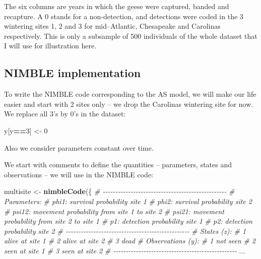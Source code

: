 \documentclass[
  12pt,
]{krantz}
\newenvironment{Shaded}{\begin{snugshade}}{\end{snugshade}}
\newcommand{\CommentTok}[1]{\textcolor[rgb]{0.56,0.35,0.01}{\textit{#1}}}
\newcommand{\DecValTok}[1]{\textcolor[rgb]{0.00,0.00,0.81}{#1}}
\newcommand{\FunctionTok}[1]{\textcolor[rgb]{0.13,0.29,0.53}{\textbf{#1}}}
\newcommand{\NormalTok}[1]{#1}
\newcommand{\OtherTok}[1]{\textcolor[rgb]{0.56,0.35,0.01}{#1}}
\newcommand{\SpecialCharTok}[1]{\textcolor[rgb]{0.81,0.36,0.00}{\textbf{#1}}}
\begin{document}
The six columns are years in which the geese were captured, banded and recapture. A 0 stands for a non-detection, and detections were coded in the 3 wintering sites 1, 2 and 3 for mid--Atlantic, Chesapeake and Carolinas respectively. This is only a subsample of 500 individuals of the whole dataset that I will use for illustration here.

\subsection{NIMBLE implementation}\label{nimble-implementation-1}

To write the NIMBLE code corresponding to the AS model, we will make our life easier and start with 2 sites only -- we drop the Carolinas wintering site for now. We replace all 3's by 0's in the dataset:

\begin{Shaded}
\begin{Highlighting}[]
\NormalTok{y[y}\SpecialCharTok{==}\DecValTok{3}\NormalTok{] }\OtherTok{\textless{}{-}} \DecValTok{0}
\end{Highlighting}
\end{Shaded}

Also we consider parameters constant over time.

We start with comments to define the quantities -- parameters, states and observations -- we will use in the NIMBLE code:

\begin{Shaded}
\begin{Highlighting}[]
\NormalTok{multisite }\OtherTok{\textless{}{-}} \FunctionTok{nimbleCode}\NormalTok{(\{}
  \CommentTok{\# {-}{-}{-}{-}{-}{-}{-}{-}{-}{-}{-}{-}{-}{-}{-}{-}{-}{-}{-}{-}{-}{-}{-}{-}{-}{-}{-}{-}{-}{-}{-}{-}{-}{-}{-}{-}{-}{-}{-}{-}{-}{-}{-}{-}{-}{-}{-}{-}{-}}
  \CommentTok{\# Parameters:}
  \CommentTok{\# phi1: survival probability site 1}
  \CommentTok{\# phi2: survival probability site 2}
  \CommentTok{\# psi12: movement probability from site 1 to site 2}
  \CommentTok{\# psi21: movement probability from site 2 to site 1}
  \CommentTok{\# p1: detection probability site 1}
  \CommentTok{\# p2: detection probability site 2}
  \CommentTok{\# {-}{-}{-}{-}{-}{-}{-}{-}{-}{-}{-}{-}{-}{-}{-}{-}{-}{-}{-}{-}{-}{-}{-}{-}{-}{-}{-}{-}{-}{-}{-}{-}{-}{-}{-}{-}{-}{-}{-}{-}{-}{-}{-}{-}{-}{-}{-}{-}{-}}
  \CommentTok{\# States (z):}
  \CommentTok{\# 1 alive at site 1}
  \CommentTok{\# 2 alive at site 2}
  \CommentTok{\# 3 dead}
  \CommentTok{\# Observations (y):}
  \CommentTok{\# 1 not seen}
  \CommentTok{\# 2 seen at site 1}
  \CommentTok{\# 3 seen at site 2}
  \CommentTok{\# {-}{-}{-}{-}{-}{-}{-}{-}{-}{-}{-}{-}{-}{-}{-}{-}{-}{-}{-}{-}{-}{-}{-}{-}{-}{-}{-}{-}{-}{-}{-}{-}{-}{-}{-}{-}{-}{-}{-}{-}{-}{-}{-}{-}{-}{-}{-}{-}{-}}
\NormalTok{...}
\end{Highlighting}
\end{Shaded}
\end{document}
